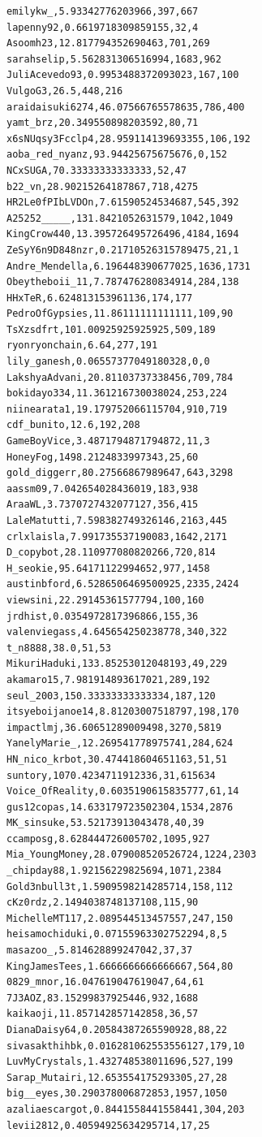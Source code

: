 \begin{verbatim}
emilykw_,5.93342776203966,397,667
lapenny92,0.6619718309859155,32,4
Asoomh23,12.817794352690463,701,269
sarahselip,5.562831306516994,1683,962
JuliAcevedo93,0.9953488372093023,167,100
VulgoG3,26.5,448,216
araidaisuki6274,46.07566765578635,786,400
yamt_brz,20.349550898203592,80,71
x6sNUqsy3Fcclp4,28.959114139693355,106,192
aoba_red_nyanz,93.94425675675676,0,152
NCxSUGA,70.33333333333333,52,47
b22_vn,28.90215264187867,718,4275
HR2Le0fPIbLVDOn,7.61590524534687,545,392
A25252_____,131.8421052631579,1042,1049
KingCrow440,13.395726495726496,4184,1694
ZeSyY6n9D848nzr,0.21710526315789475,21,1
Andre_Mendella,6.196448390677025,1636,1731
Obeytheboii_11,7.787476280834914,284,138
HHxTeR,6.624813153961136,174,177
PedroOfGypsies,11.86111111111111,109,90
TsXzsdfrt,101.00925925925925,509,189
ryonryonchain,6.64,277,191
lily_ganesh,0.06557377049180328,0,0
LakshyaAdvani,20.81103737338456,709,784
bokidayo334,11.361216730038024,253,224
niinearata1,19.179752066115704,910,719
cdf_bunito,12.6,192,208
GameBoyVice,3.4871794871794872,11,3
HoneyFog,1498.2124833997343,25,60
gold_diggerr,80.27566867989647,643,3298
aassm09,7.042654028436019,183,938
AraaWL,3.7370727432077127,356,415
LaleMatutti,7.598382749326146,2163,445
crlxlaisla,7.991735537190083,1642,2171
D_copybot,28.110977080820266,720,814
H_seokie,95.64171122994652,977,1458
austinbford,6.5286506469500925,2335,2424
viewsini,22.29145361577794,100,160
jrdhist,0.0354972817396866,155,36
valenviegass,4.645654250238778,340,322
t_n8888,38.0,51,53
MikuriHaduki,133.85253012048193,49,229
akamaro15,7.981914893617021,289,192
seul_2003,150.33333333333334,187,120
itsyeboijanoe14,8.81203007518797,198,170
impactlmj,36.60651289009498,3270,5819
YanelyMarie_,12.269541778975741,284,624
HN_nico_krbot,30.474418604651163,51,51
suntory,1070.4234711912336,31,615634
Voice_OfReality,0.6035190615835777,61,14
gus12copas,14.633179723502304,1534,2876
MK_sinsuke,53.52173913043478,40,39
ccamposg,8.628444726005702,1095,927
Mia_YoungMoney,28.079008520526724,1224,2303
_chipday88,1.92156229825694,1071,2384
Gold3nbull3t,1.5909598214285714,158,112
cKz0rdz,2.1494038748137108,115,90
MichelleMT117,2.089544513457557,247,150
heisamochiduki,0.07155963302752294,8,5
masazoo_,5.814628899247042,37,37
KingJamesTees,1.6666666666666667,564,80
0829_mnor,16.047619047619047,64,61
7J3AOZ,83.15299837925446,932,1688
kaikaoji,11.857142857142858,36,57
DianaDaisy64,0.20584387265590928,88,22
sivasakthihbk,0.016281062553556127,179,10
LuvMyCrystals,1.432748538011696,527,199
Sarap_Mutairi,12.653554175293305,27,28
big__eyes,30.290378006872853,1957,1050
azaliaescargot,0.8441558441558441,304,203
levii2812,0.40594925634295714,17,25

\end{verbatim}
